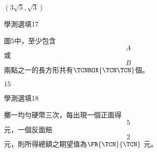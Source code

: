 \begin{QUESTIONS}
\begin{QUESTION}
\begin{QBODY}
        \end{QBODY}
        \begin{QFROMS}
        \end{QFROMS}
        \begin{QTAGS}\end{QTAGS}
        \begin{QANS}
            $(3\sqrt{5}, \sqrt{3})$
        \end{QANS}
        \begin{QSOLLIST}
        \end{QSOLLIST}
        \begin{QEMPTYSPACE}
        \end{QEMPTYSPACE}
    \end{QUESTION}
    \begin{QUESTION}
        \begin{ExamInfo}{85}{學測}{選填}{17}
        \end{ExamInfo}
        \begin{ExamAnsRateInfo}{}{}{}{}
        \end{ExamAnsRateInfo}
        \begin{QBODY}
            圖5中，至少包含\[A\]或\[B\]兩點之一的長方形共有$\TCNBOX{\TCN\TCN}$個。
        \end{QBODY}
        \begin{QFROMS}
        \end{QFROMS}
        \begin{QTAGS}\end{QTAGS}
        \begin{QANS}
            $15$
        \end{QANS}
        \begin{QSOLLIST}
        \end{QSOLLIST}
        \begin{QEMPTYSPACE}
        \end{QEMPTYSPACE}
    \end{QUESTION}
    \begin{QUESTION}
        \begin{ExamInfo}{85}{學測}{選填}{18}
        \end{ExamInfo}
        \begin{ExamAnsRateInfo}{}{}{}{}
        \end{ExamAnsRateInfo}
        \begin{QBODY}
            擲一均勻硬幣三次，每出現一個正面得\[5\]元，一個反面賠\[2\]元，則所得總額之期望值為$\FR{\TCN}{\TCN}$ 元。
        \end{QBODY}

\end{QUESTION}
\end{QUESTIONS}
